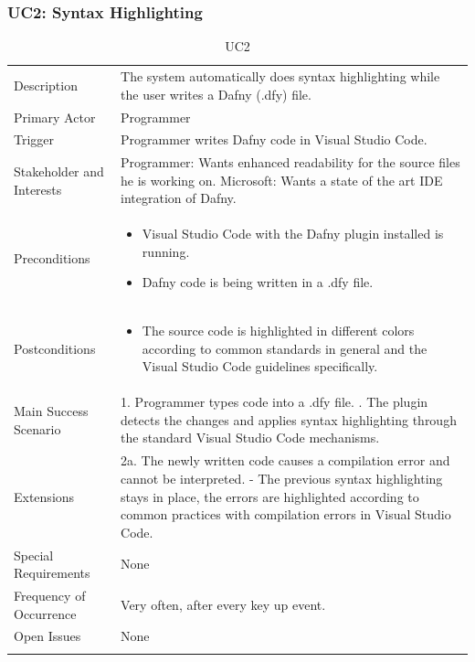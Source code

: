 \subsubsection{UC2: Syntax Highlighting}
\begin{longtable}{l | p{} }
	Description & The system automatically does syntax highlighting while the user writes a Dafny (.dfy) file.\\ 
	Primary Actor & Programmer\\ 
	Trigger & Programmer writes Dafny code in Visual Studio Code.\\ 
	Stakeholder and Interests & Programmer: Wants enhanced readability for the source files he is working on. \newline Microsoft: Wants a state of the art IDE integration of Dafny.\\ 
	Preconditions &
	\begin{itemize}
		\item Visual Studio Code with the Dafny plugin installed is running.
		\item Dafny code is being written in a .dfy file.
	\end{itemize}\\ 
	Postconditions &
	\begin{itemize}
		\item The source code is highlighted in different colors according to common standards in general and the Visual Studio Code guidelines specifically.
	\end{itemize}\\ 
	Main Success Scenario & 
	1. Programmer types code into a .dfy file. \newline
	2. The plugin detects the changes and applies syntax highlighting through the standard Visual Studio Code mechanisms.\\ 
	Extensions & 
	2a. The newly written code causes a compilation error and cannot be interpreted. \newline 
	- The previous syntax highlighting stays in place, the errors are highlighted according to common practices with compilation errors in Visual Studio Code. \\ 
	Special Requirements & None\\ 
	Frequency of Occurrence & Very often, after every key up event.\\ 
	Open Issues & None \\ 
	\caption{UC2}
\end{longtable}


